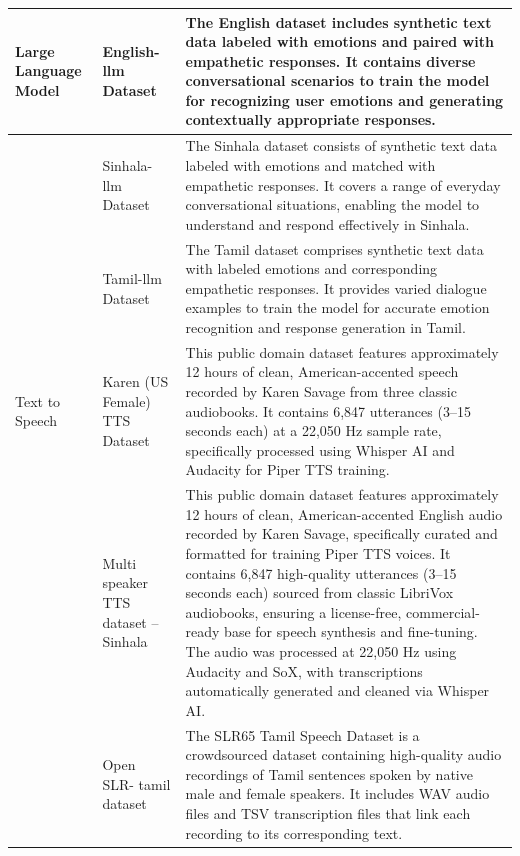 \begin{table}[H]
\begin{tabular}{|>{\RaggedRight}p{}|>{\RaggedRight}p{}|>{\RaggedRight}p{}|}
Large Language Model & English-llm Dataset & The English dataset includes synthetic text data labeled with emotions and paired with empathetic responses. It contains diverse conversational scenarios to train the model for recognizing user emotions and generating contextually appropriate responses. \\ \hline
& Sinhala-llm Dataset & The Sinhala dataset consists of synthetic text data labeled with emotions and matched with empathetic responses. It covers a range of everyday conversational situations, enabling the model to understand and respond effectively in Sinhala. \\ \hline
& Tamil-llm Dataset & The Tamil dataset comprises synthetic text data with labeled emotions and corresponding empathetic responses. It provides varied dialogue examples to train the model for accurate emotion recognition and response generation in Tamil. \\ \hline
Text to Speech & Karen (US Female) TTS Dataset & This public domain dataset features approximately 12 hours of clean, American-accented speech recorded by Karen Savage from three classic audiobooks. It contains 6,847 utterances (3–15 seconds each) at a 22,050 Hz sample rate, specifically processed using Whisper AI and Audacity for Piper TTS training. \\ \hline
& Multi speaker TTS dataset – Sinhala & This public domain dataset features approximately 12 hours of clean, American-accented English audio recorded by Karen Savage, specifically curated and formatted for training Piper TTS voices. It contains 6,847 high-quality utterances (3–15 seconds each) sourced from classic LibriVox audiobooks, ensuring a license-free, commercial-ready base for speech synthesis and fine-tuning. The audio was processed at 22,050 Hz using Audacity and SoX, with transcriptions automatically generated and cleaned via Whisper AI. \\ \hline
& Open SLR- tamil dataset & The SLR65 Tamil Speech Dataset is a crowdsourced dataset containing high-quality audio recordings of Tamil sentences spoken by native male and female speakers. It includes WAV audio files and TSV transcription files that link each recording to its corresponding text. \\ \hline
\end{tabular}
\end{table}
